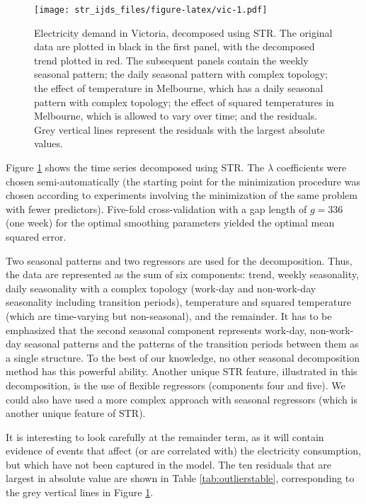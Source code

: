 \documentclass[11pt,a4paper,]{article}
\begin{document}
\begin{figure}
\centering
\texttt{[image: str\_ijds\_files/figure-latex/vic-1.pdf]}
\caption{\label{fig:vic}Electricity demand in Victoria, decomposed using STR. The original data are plotted in black in the first panel, with the decomposed trend plotted in red. The subsequent panels contain the weekly seasonal pattern; the daily seasonal pattern with complex topology; the effect of temperature in Melbourne, which has a daily seasonal pattern with complex topology; the effect of squared temperatures in Melbourne, which is allowed to vary over time; and the residuals. Grey vertical lines represent the residuals with the largest absolute values.}
\end{figure}

Figure \ref{fig:vic} shows the time series decomposed using STR.
The \(\lambda\) coefficients were chosen semi-automatically (the starting point for the minimization procedure was chosen according to experiments involving the minimization of the same problem with fewer predictors). Five-fold cross-validation with a gap length of \(g=336\) (one week) for the optimal smoothing parameters yielded the optimal mean squared error.

Two seasonal patterns and two regressors are used for the decomposition.
Thus, the data are represented as the sum of six components: trend, weekly seasonality, daily seasonality with a complex topology (work-day and non-work-day seasonality including transition periods), temperature and squared temperature (which are time-varying but non-seasonal), and the remainder. It has to be emphasized that the second seasonal component represents work-day, non-work-day seasonal patterns and the patterns of the transition periods between them as a single structure. To the best of our knowledge, no other seasonal decomposition method has this powerful ability. Another unique STR feature, illustrated in this decomposition, is the use of flexible regressors (components four and five). We could also have used a more complex approach with seasonal regressors (which is another unique feature of STR).

It is interesting to look carefully at the remainder term, as it will contain evidence of events that affect (or are correlated with) the electricity consumption, but which have not been captured in the model. The ten residuals that are largest in absolute value are shown in Table \ref{tab:outlierstable}, corresponding to the grey vertical lines in Figure \ref{fig:vic}.
\end{document}

